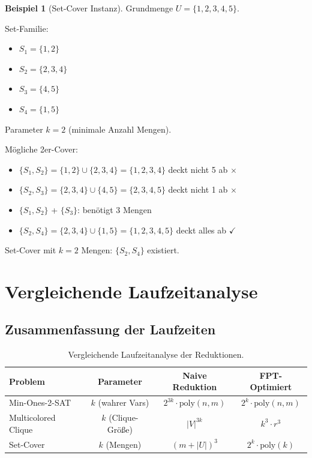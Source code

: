 ﻿\documentclass[a4paper,12pt]{article}
\theoremstyle{definition}
\newtheorem{beispiel}{Beispiel}[section]
\begin{document}
\begin{beispiel}[Set-Cover Instanz]
	Grundmenge $U = \{1, 2, 3, 4, 5\}$.
	
	Set-Familie:
	\begin{itemize}
		\item $S_1 = \{1, 2\}$
		\item $S_2 = \{2, 3, 4\}$
		\item $S_3 = \{4, 5\}$
		\item $S_4 = \{1, 5\}$
	\end{itemize}
	
	Parameter $k = 2$ (minimale Anzahl Mengen).
	
	Mögliche 2er-Cover:
	\begin{itemize}
		\item $\{S_1, S_2\} = \{1,2\} \cup \{2,3,4\} = \{1,2,3,4\}$ deckt nicht 5 ab $\times$
		\item $\{S_2, S_3\} = \{2,3,4\} \cup \{4,5\} = \{2,3,4,5\}$ deckt nicht 1 ab $\times$
		\item $\{S_1, S_2\}$ + $\{S_3\}$: benötigt 3 Mengen
		\item $\{S_2, S_4\} = \{2,3,4\} \cup \{1,5\} = \{1,2,3,4,5\}$ deckt alles ab $\checkmark$
	\end{itemize}
	
	Set-Cover mit $k=2$ Mengen: $\{S_2, S_4\}$ existiert.
\end{beispiel}

\section{Vergleichende Laufzeitanalyse}

\subsection{Zusammenfassung der Laufzeiten}

\begin{table}[h]
	\centering
	\begin{tabular}{|l|c|c|c|}
		\hline
		\textbf{Problem} & \textbf{Parameter} & \textbf{Naive Reduktion} & \textbf{FPT-Optimiert} \\
		\hline
		Min-Ones-2-SAT & $k$ (wahrer Vars) & $2^{3k} \cdot \text{poly}(n,m)$ & $2^k \cdot \text{poly}(n,m)$ \\
		\hline
		Multicolored Clique & $k$ (Clique-Größe) & $|V|^{3k}$ & $k^3 \cdot r^3$ \\
		\hline
		Set-Cover & $k$ (Mengen) & $(m + |U|)^3$ & $2^k \cdot \text{poly}(k)$ \\
		\hline
	\end{tabular}
	\caption{Vergleichende Laufzeitanalyse der Reduktionen.}
\end{table}
\end{document}
